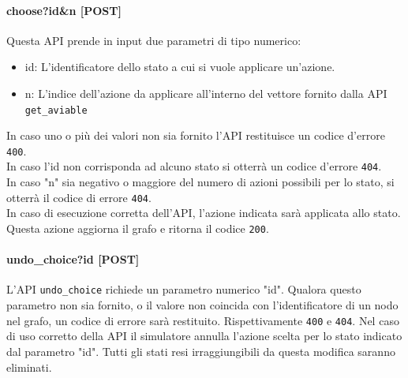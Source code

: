 \documentclass[a4paper, 11pt, titlepage, twoside, openany]{book}
\begin{document}
\paragraph{choose?id\&n [POST]}
Questa API prende in input due parametri di tipo numerico:
\begin{itemize}
    \item id: L'identificatore dello stato a cui si vuole applicare un'azione.
    \item n: L'indice dell'azione da applicare all'interno del vettore fornito dalla API \texttt{get\_aviable}
\end{itemize}
In caso uno o più dei valori non sia fornito l'API restituisce un codice d'errore \texttt{400}. \\
In caso l'id non corrisponda ad alcuno stato si otterrà un codice d'errore \texttt{404}. \\
In caso "n" sia negativo o maggiore del numero di azioni possibili per lo stato, si otterrà il codice di errore \texttt{404}. \\
In caso di esecuzione corretta dell'API, l'azione indicata sarà applicata allo stato. Questa azione aggiorna il grafo e ritorna il codice \texttt{200}.

\paragraph{undo\_choice?id [POST]}
L'API \texttt{undo\_choice} richiede un parametro numerico "id". Qualora questo parametro non sia fornito, o il valore non coincida con l'identificatore di un nodo nel grafo, un codice di errore sarà restituito. Rispettivamente \texttt{400} e \texttt{404}.
Nel caso  di uso corretto della API il simulatore annulla l'azione scelta per lo stato indicato dal parametro "id". Tutti gli stati resi irraggiungibili da questa modifica saranno eliminati.
\end{document}
